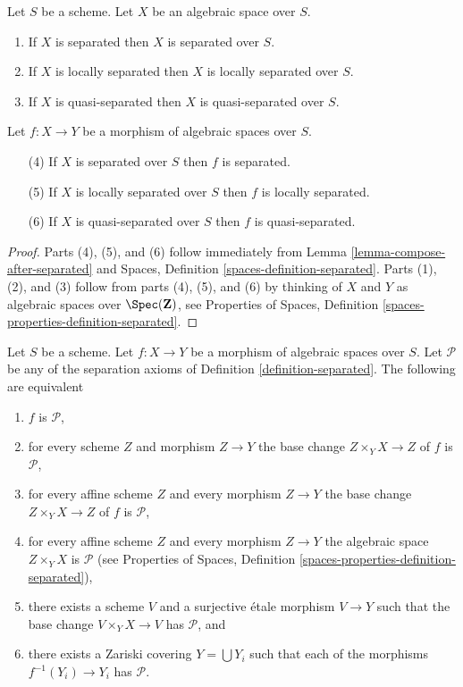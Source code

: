 \begin{lemma}
\label{lemma-separated-implies-morphism-separated}
Let $S$ be a scheme. Let $X$ be an algebraic space over $S$.
\begin{enumerate}
\item If $X$ is separated then $X$ is separated over $S$.
\item If $X$ is locally separated then $X$ is locally separated over $S$.
\item If $X$ is quasi-separated then $X$ is quasi-separated over $S$.
\end{enumerate}
Let $f : X \to Y$ be a morphism of algebraic spaces over $S$.
\begin{enumerate}
\item[(4)] If $X$ is separated over $S$ then $f$ is separated.
\item[(5)] If $X$ is locally separated over $S$ then $f$ is locally separated.
\item[(6)] If $X$ is quasi-separated over $S$ then $f$ is quasi-separated.
\end{enumerate}
\end{lemma}

\begin{proof}
Parts (4), (5), and (6) follow immediately from
Lemma \ref{lemma-compose-after-separated}
and
Spaces, Definition \ref{spaces-definition-separated}.
Parts (1), (2), and (3) follow from parts (4), (5), and (6) by
thinking of $X$ and $Y$ as algebraic spaces over
$\Spec(\mathbf{Z})$, see
Properties of Spaces, Definition \ref{spaces-properties-definition-separated}.
\end{proof}

\begin{lemma}
\label{lemma-separated-local}
Let $S$ be a scheme.
Let $f : X \to Y$ be a morphism of algebraic spaces over $S$.
Let $\mathcal{P}$ be any of the separation
axioms of Definition \ref{definition-separated}.
The following are equivalent
\begin{enumerate}
\item $f$ is $\mathcal{P}$,
\item for every scheme $Z$ and morphism $Z \to Y$ the
base change $Z \times_Y X \to Z$ of $f$ is $\mathcal{P}$,
\item for every affine scheme $Z$ and every morphism $Z \to Y$ the
base change $Z \times_Y X \to Z$ of $f$ is $\mathcal{P}$,
\item for every affine scheme $Z$ and every morphism $Z \to Y$ the
algebraic space $Z \times_Y X$ is $\mathcal{P}$ (see
Properties of Spaces, Definition \ref{spaces-properties-definition-separated}),
\item there exists a scheme $V$ and a surjective \'etale morphism
$V \to Y$ such that the base change $V \times_Y X \to V$ has
$\mathcal{P}$, and
\item there exists a Zariski covering $Y = \bigcup Y_i$ such that each
of the morphisms $f^{-1}(Y_i) \to Y_i$ has $\mathcal{P}$.
\end{enumerate}
\end{lemma}

